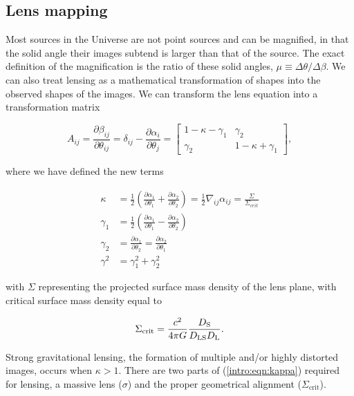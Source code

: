 \subsection{Lens mapping}

Most sources in the Universe are not point sources and can be magnified, in that the solid angle their images subtend is larger than that of the source. The exact definition of the magnification is the ratio of these solid angles,
$\mu \equiv \Delta \theta/\Delta \beta$. We can also treat lensing as a mathematical transformation of shapes into the observed shapes of the images. We can transform the lens equation into a transformation matrix

\begin{equation}
A_{ij} = \frac{\partial \beta_{ij}}{\partial \theta_{ij}} = \delta_{ij} - \frac{\partial{\alpha_{i}}}{\partial{\theta_{j}}} = 
	\begin{bmatrix}
		1-\kappa-\gamma_1 & \gamma_2 \\
		\gamma_2 & 1-\kappa+\gamma_1
	\end{bmatrix},
\end{equation}

\noindent where we have defined the new terms

\begin{align}
\kappa &= \frac{1}{2} \left(\frac{\partial{\alpha_{1}}}{\partial{\theta_{1}}}+\frac{\partial{\alpha_{2}}}{\partial{\theta_{2}}}\right) = \frac{1}{2} \nabla_{ij} \alpha_{ij} = \frac{\Sigma}{\Sigma_{crit}} \label{intro:eqn:kappa} \\
\gamma_1 &= \frac{1}{2} \left(\frac{\partial{\alpha_{1}}}{\partial{\theta_{1}}}-\frac{\partial{\alpha_{2}}}{\partial{\theta_{2}}}\right) \\
\gamma_2 &= \frac{\partial{\alpha_{1}}}{\partial{\theta_{2}}} = \frac{\partial{\alpha_{2}}}{\partial{\theta_{1}}} \\
\gamma^2 &= \gamma_1^2 + \gamma_2^2
\end{align}

\noindent with $\Sigma$ representing the projected surface mass density of the lens plane, with critical surface mass density equal to

\begin{equation}
\Sigma_\mathrm{crit} = \frac{c^2}{4\pi G} \frac{D_\mathrm{S}}{D_\mathrm{LS}D_\mathrm{L}}.
\end{equation}

\noindent Strong gravitational lensing, the formation of multiple and/or highly distorted images, occurs when $\kappa>1$. There are two parts of (\ref{intro:eqn:kappa}) required for lensing, a massive lens ($\sigma$) and the proper geometrical alignment ($\Sigma_\mathrm{crit}$).

